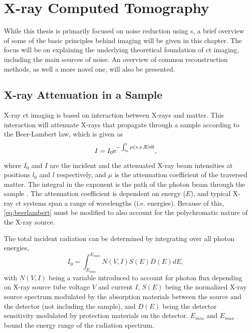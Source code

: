 \chapter{X-ray Computed Tomography}
\label{sec:ct}
While this thesis is primarily focused on noise reduction using s, a brief overview of some of the basic principles behind  imaging will be given in this chapter. The focus will be on explaining the underlying theoretical foundation of \gls{ct} imaging, including the main sources of noise. An overview of common reconstruction methods, as well a more novel one, will also be presented.

\section{X-ray Attenuation in a Sample}
\label{sec:ct:theoreticalfoundation}
X-ray \gls{ct} imaging is based on interaction between X-rays and matter. This interaction will attenuate X-rays that propagate through a sample according to the Beer-Lambert law, which is given as \cite{doi:10.1063/1.4950807} 
\begin{equation}
    \label{eq:beerlambert}
    I = I_0 \rm{e}^{-\int_{l_0}^{l}\mu\left(x,y,E\right)dl},
\end{equation}
where $I_0$ and $I$ are the incident and the attenuated X-ray beam intensities at positions $l_0$ and $l$ respectively, and $\mu$ is the attenuation coefficient of the traversed matter. The integral in the exponent is the path of the photon beam through the sample \cite{KakSlaney98}. The attenuation coefficient is dependent on energy ($E$), and typical X-ray \gls{ct} systems span a range of wavelengths (i.e. energies). Because of this, \cref{eq:beerlambert} must be modified to also account for the polychromatic nature of the X-ray source. 

The total incident radiation can be determined by integrating over all photon energies, 
\begin{equation}
    \label{eq:incidentradiation}
    I_0 = \int_{E_{min}}^{E_{max}}N\left(V,I\right)S\left(E\right)D\left(E\right)dE,
\end{equation}
with $N\left(V,I\right)$ being a variable introduced to account for photon flux depending on X-ray source tube voltage $V$ and current $I$, $S\left(E\right)$ being the normalized X-ray source spectrum modulated by the absorption materials between the source and the detector (not including the sample), and $D\left(E\right)$ being the detector sensitivity modulated by protection materials on the detector. $E_{min}$ and $E_{max}$ bound the energy range of the radiation spectrum. 

